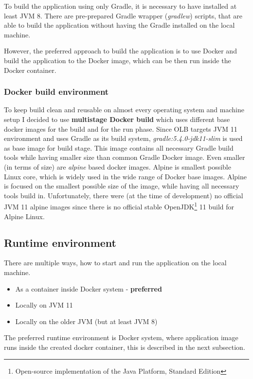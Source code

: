 To build the application using only Gradle,
it is necessary to have installed at least JVM 8.
There are pre-prepared Gradle wrapper (\textit{gradlew}) scripts,
that are able to build the application without having the Gradle installed on the local machine.

However, the preferred approach to build the application is to use Docker
and build the application to the Docker image, 
which can be then run inside the Docker container.

\subsubsection{Docker build environment}
To keep build clean and reusable on almost every operating system and 
machine setup I decided to use \textbf{multistage Docker build} 
which uses different base docker images for the build and for the run phase.
Since OLB targets JVM 11 environment and uses Gradle as its build system,
\textit{gradle:5.4.0-jdk11-slim} is used as base image for build stage.
This image contains all necessary Gradle build tools while having smaller size than common Gradle Docker image.
Even smaller (in terms of size) are \textit{alpine} based docker images. 
Alpine is smallest possible Linux core, 
which is widely used in the wide range of Docker base images.
Alpine is focused on the smallest possible size of the image, 
while having all necessary tools build in.
Unfortunately, there were (at the time of development) no official JVM 11 alpine images
since there is no official stable OpenJDK\footnote{Open-source implementation of the Java Platform, Standard Edition} 
11 build for Alpine Linux.

\subsection{Runtime environment}
There are multiple ways, how to start and run the application on the local machine.
\begin{itemize}
	\item As a container inside Docker system - \textbf{preferred}
	\item Locally on JVM 11
	\item Locally on the older JVM (but at least JVM 8)
\end{itemize}

The preferred runtime environment is Docker system, 
where application image runs inside the created docker container,
this is described in the next subsection.

